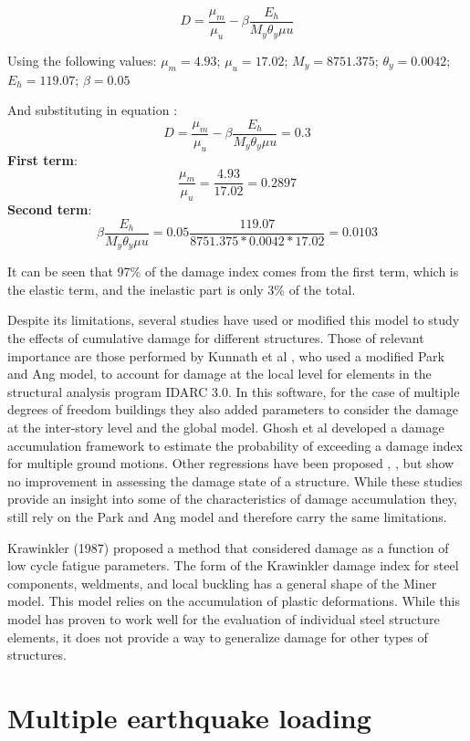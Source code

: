 \begin{equation}
	D=\frac{\mu_{m}}{\mu_{u}}-\beta\frac{E_h}{M_{y}\theta_y\mu{u}}
	\label{eq.DamageIndexGhosh}
\end{equation}

Using the following values: $\mu_{m}=4.93$; $\mu_{u}=17.02$; $M_{y}=8751.375$; $\theta_y=0.0042$; $E_{h}=119.07$; $\beta=0.05$ 

And substituting in equation :
\[
 D=\frac{\mu_{m}}{\mu_{u}}-\beta\frac{E_h}{M_{y}\theta_y\mu{u}}=0.3
	\]
\textbf{First term}:
\[
\frac{\mu_{m}}{\mu_{u}}=\frac{4.93}{17.02}=0.2897
\]
\textbf{Second term}: 
\[	
	\beta \frac{E_h}{M_{y}\theta_y\mu{u}}=0.05\frac{119.07}{8751.375*0.0042*17.02}=0.0103
\]

It can be seen that 97\% of the damage index comes from the first term, which is the elastic term, and the inelastic part is only 3\% of the total. 

Despite its limitations, several studies have used or modified this model to study the effects of cumulative damage for different structures. Those of relevant importance are those performed by Kunnath et al \cite{Kunnath1992}, who used a modified Park and Ang model, to account for damage at the local level for elements in the structural analysis program IDARC 3.0. In this software, for the case of multiple degrees of freedom buildings they also added parameters to consider the damage at the inter-story level and the global model. Ghosh et al \cite{Ghosh2015} developed a damage accumulation framework to estimate the probability of exceeding a damage index for multiple ground motions. Other regressions have been proposed \cite{Khashaee}, \cite{Fajfar1992}, \cite{Roufaiel} but show no improvement in assessing the damage state of a structure. While these studies provide an insight into some of the characteristics of damage accumulation they, still rely on the Park and Ang model and therefore carry the same limitations.

Krawinkler (1987) \cite{Krawinkler1987} proposed a method that considered damage as a function of low cycle fatigue parameters. The form of the Krawinkler damage index for steel components, weldments, and local buckling has a general shape of the Miner model. This model relies on the accumulation of plastic deformations. While this model has proven to work well for the evaluation of individual steel structure elements, it does not provide a way to generalize damage for other types of structures.


\section{Multiple earthquake loading}

